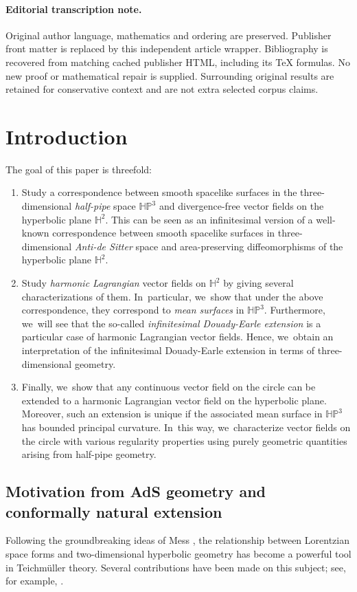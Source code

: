\documentclass[11pt]{article}
\newcommand{\Subsection}{\subsection}
\theoremstyle{plain}
\theoremstyle{definition}
\newcommand{\HP}{\mathbb{HP}^3}
\begin{document}
\paragraph{Editorial transcription note.}
Original author language, mathematics and ordering are preserved. Publisher front matter is replaced by this independent article wrapper. Bibliography is recovered from matching cached publisher HTML, including its TeX formulas. No new proof or mathematical repair is supplied. Surrounding original results are retained for conservative context and are not extra selected corpus claims.
\clearpage

\section{Introduction}
The goal of this paper is threefold:
\begin{enumerate}
\item Study a correspondence between smooth spacelike surfaces in the three-dimensional \emph{half-pipe} space $\HP$ and divergence-free vector fields on the hyperbolic plane $\mathbb{H}^2$. This can be seen as an infinitesimal version of a well-known correspondence between smooth spacelike surfaces in three-dimensional \emph{Anti-de Sitter} space and area-preserving diffeomorphisms of the hyperbolic plane $\mathbb{H}^2$.
\item Study \emph{harmonic Lagrangian} vector fields on $\mathbb{H}^2$ by giving several characterizations of them. In~particular, we~show that under the above correspondence, they correspond to \emph{mean surfaces} in $\HP$. Furthermore, we~will see that the so-called \emph{infinitesimal Douady-Earle extension} is a particular case of harmonic Lagrangian vector fields. Hence, we~obtain an interpretation of the infinitesimal Douady-Earle extension in terms of three-dimensional geometry.
\item Finally, we~show that any continuous vector field on the circle can be extended to a harmonic Lagrangian vector field on the hyperbolic plane. Moreover, such an extension is unique if the associated mean surface in \(\HP\) has bounded principal curvature. In~this way, we~characterize vector fields on the circle with various regularity properties using purely geometric quantities arising from half-pipe geometry.
\end{enumerate}

\Subsection{Motivation from AdS geometry and conformally natural extension}
Following the groundbreaking ideas of Mess \cite{Mess}, the relationship between Lorentzian space forms and two-dimensional hyperbolic geometry has become a powerful tool in Teichmüller theory. Several contributions have been made on this subject; see, for example, \cite{Note_on_paper_mess,flatspacetimes_bonsante,Barbot_flatspacetime,canorot,BS_flat_conical}.
\end{document}
